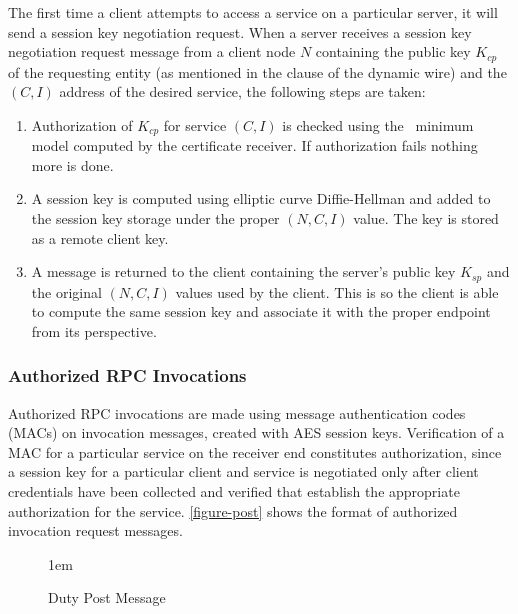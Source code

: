 The first time a client attempts to access a service on a particular
server, it will send a session key negotiation request. When a server
receives a session key negotiation request message from a client node
$N$ containing the public key $K_{cp}$ of the requesting entity (as
mentioned in the  clause of the dynamic wire) and the $(C,
I)$ address of the desired service, the following steps are taken:
\begin{enumerate}
\item Authorization of $K_{cp}$ for service $(C, I)$ is checked using
  the \RT\ minimum model computed by the certificate receiver. If
  authorization fails nothing more is done.
\item A session key is computed using elliptic curve Diffie-Hellman and
  added to the session key storage under the proper $(N, C, I)$ value.
  The key is stored as a remote client key.
\item A message is returned to the client containing the server's public
  key $K_{sp}$ and the original $(N, C, I)$ values used by the client.
  This is so the client is able to compute the same session key and
  associate it with the proper endpoint from its perspective.
\end{enumerate}

\subsubsection{Authorized RPC Invocations}

Authorized RPC invocations are made using message authentication codes
(MACs) on invocation messages, created with AES session
keys. Verification of a MAC for a particular service on the receiver
end constitutes authorization, since a session key for a particular
client and service is negotiated only after client credentials have
been collected and verified that establish the appropriate
authorization for the service. \autoref{figure-post} shows the format
of authorized invocation request messages.

\begin{figure}[t]
  
  \centerline{\raise 1em\box\graph}
  \caption{Duty Post Message}
  \label{figure-post}
\end{figure}

